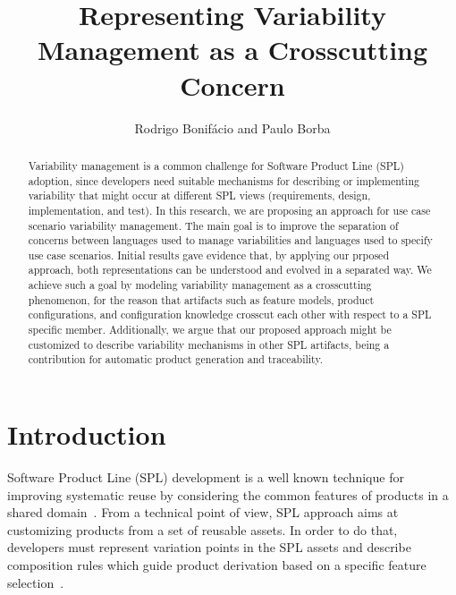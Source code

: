 \documentclass[11pt]{report}
\begin{document}
\title{Representing Variability Management as a Crosscutting Concern}

\author{Rodrigo Bonif\'{a}cio and Paulo Borba}

\maketitle              

\tableofcontents

\begin{abstract}
Variability management is a common challenge for Software Product
Line (SPL) adoption, since developers need suitable
mechanisms for describing or implementing variability
that might occur at different SPL views (requirements, design,
implementation, and test). In this research, we are proposing an 
approach for use case scenario variability management. The main goal is to 
improve the separation of concerns between languages used to manage
variabilities and languages used to specify use case scenarios. 
Initial results gave evidence that, by applying our prposed 
approach, both representations can be understood and evolved in
a separated way. We achieve such a goal by modeling variability management
as a crosscutting phenomenon, for the reason that artifacts such as feature models, 
product configurations, and configuration knowledge crosscut each 
other with respect to a SPL specific member. Additionally, we argue 
that our proposed approach might be customized to describe variability
mechanisms in other SPL artifacts, being a contribution for
automatic product generation and traceability.
\end{abstract}


%
\chapter{Introduction}
%
Software Product Line (SPL) development is a well known technique for 
improving systematic reuse by considering the common features of products in a 
shared domain~\cite{northrop-spl-book}. From a technical point of view, 
SPL approach aims at customizing products from a set of reusable assets. 
In order to do that, developers must represent variation points in the SPL 
assets and describe composition rules which guide product derivation based 
on a specific feature selection~\cite{phol-spl-book}. 
\end{document}
